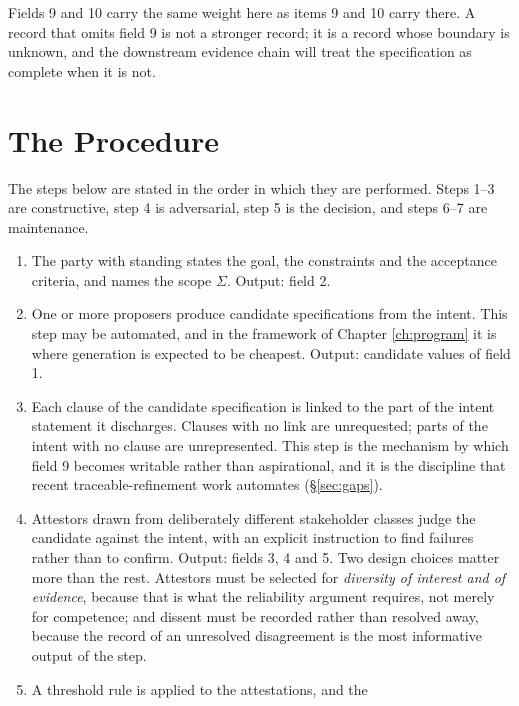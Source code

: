 Fields 9 and 10 carry the same weight here as items 9 and 10 carry there. A record that omits field
9 is not a stronger record; it is a record whose boundary is unknown, and the downstream evidence
chain will treat the specification as complete when it is not.

\section{The Procedure}

The steps below are stated in the order in which they are performed. Steps 1--3 are constructive,
step 4 is adversarial, step 5 is the decision, and steps 6--7 are maintenance.

\begin{enumerate}[label=\textbf{P\arabic*.},leftmargin=*]
\item {} The party with standing states the goal, the constraints and the
      acceptance criteria, and names the scope $\Sigma$. Output: field 2.
\item {} One or more proposers produce candidate specifications from
      the intent. This step may be automated, and in the framework of Chapter \ref{ch:program} it
      is where generation is expected to be cheapest. Output: candidate values of field 1.
\item {} Each clause of the candidate specification is linked to
      the part of the intent statement it discharges. Clauses with no link are unrequested; parts
      of the intent with no clause are unrepresented. This step is the mechanism by which field 9
      becomes writable rather than aspirational, and it is the discipline that recent
      traceable-refinement work automates (\S\ref{sec:gaps}).
\item {} Attestors drawn from deliberately different stakeholder classes
      judge the candidate against the intent, with an explicit instruction to find failures rather
      than to confirm. Output: fields 3, 4 and 5. Two design choices matter more than the rest.
      Attestors must be selected for \emph{diversity of interest and of evidence}, because that is
      what the reliability argument requires, not merely for competence; and dissent must be
      recorded rather than resolved away, because the record of an unresolved disagreement is the
      most informative output of the step.
\item {} A threshold rule is applied to the attestations, and the

\end{enumerate}
